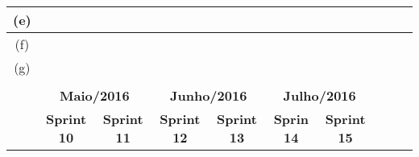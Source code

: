 \begin{table}[]
\begin{tabular}{|c|l|l|l|l|l|l|l|l|l|}
(e)                             &                                                 &                                         &                                         &                                         &                                        & \cellcolor[HTML]{C0C0C0}                &                                        &                                        &                                        \\ \hline
(f)                             &                                                 &                                         &                                         &                                         &                                        &                                         &                                        &                                        &                                        \\ \hline
(g)                             &                                                 &                                         &                                         &                                         &                                        &                                         &                                        &                                        &                                        \\ \hline
\rowcolor[HTML]{343434}
                                &                                                 &                                         &                                         &                                         &                                        &                                         &                                        &                                        &                                        \\ \hline
                                & \multicolumn{2}{c|}{\textbf{Maio/2016}}                                                   & \multicolumn{2}{c|}{\textbf{Junho/2016}}                                          & \multicolumn{2}{c|}{\textbf{Julho/2016}}                                         & \multicolumn{3}{l|}{}                                                                                                    \\ \cline{1-7}
                                & \multicolumn{1}{c|}{\textbf{Sprint 10}}         & \multicolumn{1}{c|}{\textbf{Sprint 11}} & \multicolumn{1}{c|}{\textbf{Sprint 12}} & \multicolumn{1}{c|}{\textbf{Sprint 13}} & \multicolumn{1}{c|}{\textbf{Sprin 14}} & \multicolumn{1}{c|}{\textbf{Sprint 15}} & \multicolumn{3}{l|}{}                                                                                                    \\ \cline{1-7}

\end{tabular}
\end{table}
